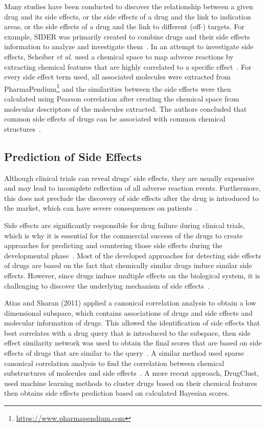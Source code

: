 Many studies have been conducted to discover the relationship between a given drug and its side effects, or the side effects of a drug and the link to indication areas, or the side effects of a drug and the link to different (off-) targets.
For example, \ac{SIDER} was primarily created to combine drugs and their side effects information to analyze and investigate them~\cite{kuhn_side_2010}.
In an attempt to investigate side effects, Scheiber \textit{et al.} used a chemical space to map adverse reactions by extracting chemical features that are highly correlated to a specific effect~\cite{scheiber_mapping_2009}.
For every side effect term used, all associated molecules were extracted from PharmaPendium\footnote{\url{https://www.pharmapendium.com}} and the similarities between the side effects were then calculated using Pearson correlation after creating the chemical space from molecular descriptors of the molecules extracted.
The authors concluded that common side effects of drugs can be associated with common chemical structures~\cite{scheiber_mapping_2009}.

\subsection{Prediction of Side Effects}

Although clinical trials can reveal drugs' side effects, they are usually expensive and may lead to incomplete reflection of all adverse reaction events.
Furthermore, this does not preclude the discovery of side effects after the drug is introduced to the market, which can have severe consequences on patients~\cite{dimitri_drugclust:_2017}.

Side effects are significantly responsible for drug failure during clinical trials, which is why it is essential for the commercial success of the drugs to create approaches for predicting and countering those side effects during the developmental phase~\cite{mizutani_relating_2012}.
Most of the developed approaches for detecting side effects of drugs are based on the fact that chemically similar drugs induce similar side effects.
However, since drugs induce multiple effects on the biological system, it is challenging to discover the underlying mechanism of side effects~\cite{dimitri_drugclust:_2017}.

Atias and Sharan (2011) applied a canonical correlation analysis to obtain a low dimensional subspace, which contains associations of drugs and side effects and molecular information of drugs.
This allowed the identification of side effects that best correlates with a drug query that is introduced to the subspace, then side effect similarity network was used to obtain the final scores that are based on side effects of drugs that are similar to the query~\cite{atias_algorithmic_2011}.
A similar method used sparse canonical correlation analysis to find the correlation between chemical substructures of molecules and side effects~\cite{pauwels_predicting_2011}.
A more recent approach, DrugClust, used machine learning methods to cluster drugs based on their chemical features then obtains side effects prediction based on calculated Bayesian scores\cite{dimitri_drugclust:_2017}.

